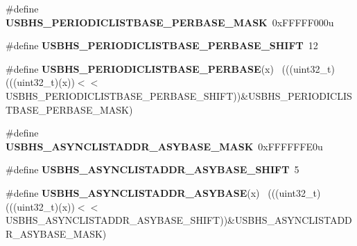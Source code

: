 \begin{DoxyCompactItemize}
\item 
\hypertarget{group___u_s_b_h_s___register___masks_gadc8a062d739b0b37d60458f0f1680bed}{}\#define {\bfseries U\+S\+B\+H\+S\+\_\+\+P\+E\+R\+I\+O\+D\+I\+C\+L\+I\+S\+T\+B\+A\+S\+E\+\_\+\+P\+E\+R\+B\+A\+S\+E\+\_\+\+M\+A\+S\+K}~0x\+F\+F\+F\+F\+F000u\label{group___u_s_b_h_s___register___masks_gadc8a062d739b0b37d60458f0f1680bed}

\item 
\hypertarget{group___u_s_b_h_s___register___masks_gace1e87ff114e8ffe998367e7c28f0871}{}\#define {\bfseries U\+S\+B\+H\+S\+\_\+\+P\+E\+R\+I\+O\+D\+I\+C\+L\+I\+S\+T\+B\+A\+S\+E\+\_\+\+P\+E\+R\+B\+A\+S\+E\+\_\+\+S\+H\+I\+F\+T}~12\label{group___u_s_b_h_s___register___masks_gace1e87ff114e8ffe998367e7c28f0871}

\item 
\hypertarget{group___u_s_b_h_s___register___masks_ga41a7721beaaf39d5ad4ab97ac402d800}{}\#define {\bfseries U\+S\+B\+H\+S\+\_\+\+P\+E\+R\+I\+O\+D\+I\+C\+L\+I\+S\+T\+B\+A\+S\+E\+\_\+\+P\+E\+R\+B\+A\+S\+E}(x)            ~(((uint32\+\_\+t)(((uint32\+\_\+t)(x))$<$$<$U\+S\+B\+H\+S\+\_\+\+P\+E\+R\+I\+O\+D\+I\+C\+L\+I\+S\+T\+B\+A\+S\+E\+\_\+\+P\+E\+R\+B\+A\+S\+E\+\_\+\+S\+H\+I\+F\+T))\&U\+S\+B\+H\+S\+\_\+\+P\+E\+R\+I\+O\+D\+I\+C\+L\+I\+S\+T\+B\+A\+S\+E\+\_\+\+P\+E\+R\+B\+A\+S\+E\+\_\+\+M\+A\+S\+K)\label{group___u_s_b_h_s___register___masks_ga41a7721beaaf39d5ad4ab97ac402d800}

\item 
\hypertarget{group___u_s_b_h_s___register___masks_ga5961352e20d71f6176753901f45d0d1e}{}\#define {\bfseries U\+S\+B\+H\+S\+\_\+\+A\+S\+Y\+N\+C\+L\+I\+S\+T\+A\+D\+D\+R\+\_\+\+A\+S\+Y\+B\+A\+S\+E\+\_\+\+M\+A\+S\+K}~0x\+F\+F\+F\+F\+F\+F\+E0u\label{group___u_s_b_h_s___register___masks_ga5961352e20d71f6176753901f45d0d1e}

\item 
\hypertarget{group___u_s_b_h_s___register___masks_gadb28c825f4ef5898e35fb10f21020b43}{}\#define {\bfseries U\+S\+B\+H\+S\+\_\+\+A\+S\+Y\+N\+C\+L\+I\+S\+T\+A\+D\+D\+R\+\_\+\+A\+S\+Y\+B\+A\+S\+E\+\_\+\+S\+H\+I\+F\+T}~5\label{group___u_s_b_h_s___register___masks_gadb28c825f4ef5898e35fb10f21020b43}

\item 
\hypertarget{group___u_s_b_h_s___register___masks_ga2e3bc117b3c7a12d44a00b3d53aa0b1b}{}\#define {\bfseries U\+S\+B\+H\+S\+\_\+\+A\+S\+Y\+N\+C\+L\+I\+S\+T\+A\+D\+D\+R\+\_\+\+A\+S\+Y\+B\+A\+S\+E}(x)                  ~(((uint32\+\_\+t)(((uint32\+\_\+t)(x))$<$$<$U\+S\+B\+H\+S\+\_\+\+A\+S\+Y\+N\+C\+L\+I\+S\+T\+A\+D\+D\+R\+\_\+\+A\+S\+Y\+B\+A\+S\+E\+\_\+\+S\+H\+I\+F\+T))\&U\+S\+B\+H\+S\+\_\+\+A\+S\+Y\+N\+C\+L\+I\+S\+T\+A\+D\+D\+R\+\_\+\+A\+S\+Y\+B\+A\+S\+E\+\_\+\+M\+A\+S\+K)\label{group___u_s_b_h_s___register___masks_ga2e3bc117b3c7a12d44a00b3d53aa0b1b}


\end{DoxyCompactItemize}
